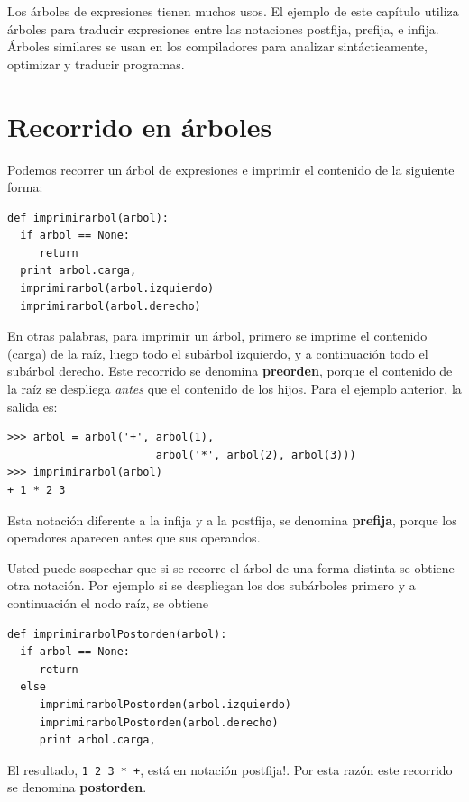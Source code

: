 Los árboles de expresiones tienen muchos usos.  El ejemplo de este 
capítulo utiliza árboles para traducir expresiones entre las notaciones
postfija, prefija, e infija.
Árboles similares se usan en los compiladores para analizar sintácticamente,
optimizar y traducir programas.


\section{Recorrido en árboles}

Podemos recorrer un árbol de expresiones e imprimir el contenido de la 
siguiente forma:

\beforeverb
\begin{verbatim}
def imprimirarbol(arbol):
  if arbol == None: 
     return
  print arbol.carga,
  imprimirarbol(arbol.izquierdo)
  imprimirarbol(arbol.derecho)
\end{verbatim}
\afterverb
%

En otras palabras, para imprimir un árbol, primero se imprime el contenido
(carga) de la raíz, luego todo el subárbol izquierdo, y a continuación
todo el subárbol derecho. Este recorrido se denomina {\bf preorden}, 
porque el contenido de la raíz se despliega {\em antes} que el contenido
de los hijos. Para el ejemplo anterior, la salida es:

\beforeverb
\begin{verbatim}
>>> arbol = arbol('+', arbol(1), 
                       arbol('*', arbol(2), arbol(3)))
>>> imprimirarbol(arbol)
+ 1 * 2 3
\end{verbatim}
\afterverb
%
Esta notación diferente a la infija y a la postfija, se denomina
 {\bf prefija}, porque los operadores aparecen antes que sus 
operandos.

Usted puede sospechar que si se recorre el árbol de una forma distinta
se obtiene otra notación. Por ejemplo si se despliegan los dos 
subárboles primero y a continuación el nodo raíz, se obtiene

\beforeverb
\begin{verbatim}
def imprimirarbolPostorden(arbol):
  if arbol == None: 
     return
  else 
     imprimirarbolPostorden(arbol.izquierdo)
     imprimirarbolPostorden(arbol.derecho)
     print arbol.carga,
\end{verbatim}
\afterverb
%
El resultado, \texttt{1 2 3 * +}, está en notación postfija!.
Por esta razón este recorrido se denomina {\bf postorden}.

